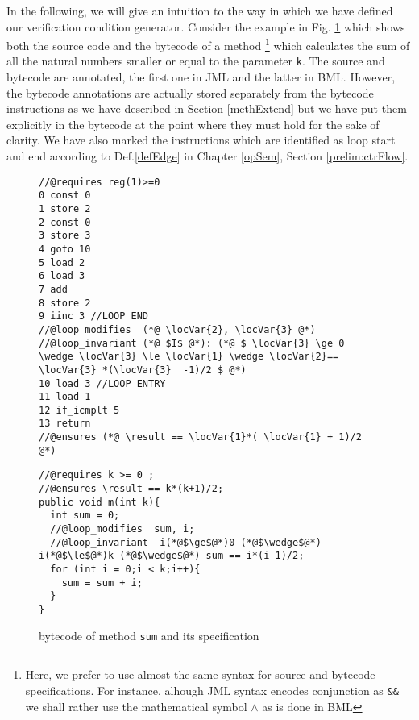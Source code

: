  In the following, we will give an intuition to the way in which we have defined our verification condition generator.
 Consider the example in Fig. \ref{wp:example:sum} which 
 shows both the source code and the bytecode of a method \footnote{Here, we prefer to use almost the same syntax  for source and bytecode specifications. For instance, alhough JML syntax encodes conjunction as \lstinline{&&} we shall rather use the mathematical symbol $\wedge$ as is done in BML}
 which calculates the sum of all the natural numbers
 smaller or equal to the parameter \lstinline!k!. The source and bytecode are annotated, the first one in JML and the latter in BML.
 However, the bytecode annotations are actually stored separately from the bytecode instructions as we have described in Section \ref{methExtend}
 but we have put them explicitly in the bytecode at the point where they must hold for the sake of clarity. 
 We have also marked the instructions which are identified as loop start and end
 according to Def.\ref{defEdge} in Chapter \ref{opSem}, Section \ref{prelim:ctrFlow}. 

  
\begin{figure}[ht!]
\begin{center}
\begin{minipage}[c]{\linewidth} 
\begin{minipage}[c]{\linewidth}
\scriptsize{
\begin{lstlisting}[frame=trbl]
//@requires reg(1)>=0
0 const 0
1 store 2
2 const 0
3 store 3
4 goto 10
5 load 2
6 load 3
7 add
8 store 2
9 iinc 3 //LOOP END
//@loop_modifies  (*@ \locVar{2}, \locVar{3} @*)  
//@loop_invariant (*@ $I$ @*): (*@ $ \locVar{3} \ge 0 \wedge \locVar{3} \le \locVar{1} \wedge \locVar{2}== \locVar{3} *(\locVar{3}  -1)/2 $ @*)
10 load 3 //LOOP ENTRY 
11 load 1
12 if_icmplt 5 
13 return
//@ensures (*@ \result == \locVar{1}*( \locVar{1} + 1)/2 @*)
\end{lstlisting}} 
\end{minipage}


\begin{minipage}[c]{\linewidth} 
\scriptsize{
\begin{lstlisting}[frame=trbl]
//@requires k >= 0 ;
//@ensures \result == k*(k+1)/2;
public void m(int k){
  int sum = 0;
  //@loop_modifies  sum, i;
  //@loop_invariant  i(*@$\ge$@*)0 (*@$\wedge$@*) i(*@$\le$@*)k (*@$\wedge$@*) sum == i*(i-1)/2; 
  for (int i = 0;i < k;i++){
    sum = sum + i;
  } 
}

\end{lstlisting} }
\end{minipage}
\end{minipage}
\end{center}
\caption{\sc  bytecode of method \lstinline!sum! and its specification }
\label{wp:example:sum}
\end{figure}



